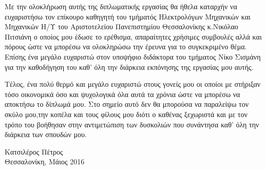 
\cleardoublepage


\begin{acknowledgements}

\par Με την ολοκλήρωση αυτής της διπλωματικής εργασίας θα ήθελα καταρχήν να ευχαριστήσω τον επίκουρο καθηγητή του τμήματός Ηλεκτρολόγων Μηχανικών και Μηχανικών Η/Υ του Αριστοτελείου Πανεπιστημίου Θεσσαλονίκης κ.Νικόλαο Πιτσιάνη ο οποίος μου έδωσε το ερέθισμα, απαραίτητες χρήσιμες συμβουλές αλλά και πόρους ώστε να μπορέσω να ολοκληρώσω την έρευνα για το συγκεκριμένο θέμα. Επίσης ένα μεγάλο ευχαριστώ στον υποψήφιο διδάκτορα του τμήματος Νίκο Σισμάνη για την καθοδήγηση του καθ' όλη την διάρκεια εκπόνησης της εργασίας μου αυτής. 

\par Τέλος, ένα πολύ θερμό και μεγάλο ευχαριστώ στους γονείς μου οι οποίοι με στήριξαν τόσο οικονομικά όσο και ψυχολογικά όλα αυτά τα χρόνια ώστε να μπορέσω να αποκτήσω το δίπλωμά μου. Στο σημείο αυτό δεν θα μπορούσα να παραλείψω τον σκύλο μου,την κοπέλα και τους φίλους μου διότι ο καθένας ξεχωριστά και με τον τρόπο του βοήθησαν στην αντιμετώπιση των δυσκολιών που συνάντησα καθ' όλη την διάρκεια των σπουδών μου.

\begin{flushright}
Κατσιλέρος Πέτρος \\
Θεσσαλονίκη, Μάιος 2016
\end{flushright}

\end{acknowledgements}
